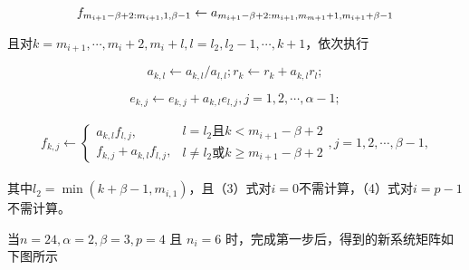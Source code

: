 \documentclass[
]{article}
\begin{document}
\[\large f_{m_{i+1}-\beta+2:m_{i+1},1,\beta-1} \gets a_{m_{i+1}-\beta+2:m_{i+1},m_{m+1}+1,m_{i+1}+\beta-1}\]

且对\(k=m_{i+1},\cdots,m_i+2,m_i+l,l=l_2,l_2-1,\cdots,k+1\)，依次执行

\begin{equation} a_{k,l} \gets a_{k,l}/a_{l,l};r_k \gets r_k + a_{k,l}r_l;\tag{2} \end{equation}

\begin{equation} e_{k,j} \gets e_{k,j}+a_{k,l}e_{l,j},j=1,2,\cdots,\alpha-1;\tag{3}
\end{equation}

\begin{align}
\tag{4}
f_{k,j} \gets
\begin{cases}
a_{k,l}f_{l,j},\\
f_{k,j}+a_{k,l}f_{l,j},
\end{cases}
\begin{matrix}
l = l_2 且 k < m_{i+1} - \beta + 2 \\
l \ne l_2 或 k \ge m_{i+1} - \beta + 2
\end{matrix}, j=1,2,\cdots,\beta-1,
\end{align}

其中\(l_2=\min(k+\beta-1,m_{i,1})\)，且（3）式对\(i=0\)不需计算，（4）式对\(i=p-1\)不需计算。

当\(n=24,\alpha=2,\beta=3,p=4\) 且 \(n_i=6\)
时，完成第一步后，得到的新系统矩阵如下图所示
\end{document}
